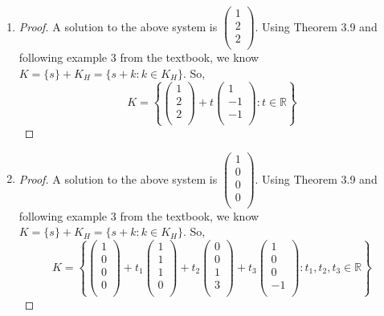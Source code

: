 \documentclass[11pt]{scrartcl}
\begin{document}
\begin{enumerate}[label=\alph*.]
	\item{
		\begin{proof}
			A solution to the above system is  
			$
			\begin{pmatrix}
				1\\
				2\\
				2\\
			\end{pmatrix}
			$.
			Using Theorem 3.9 and following example 3 from the textbook, we know $K = \{s\} + K_H = \{s + k : k \in K_H \}$.
			So, 
			\[
			K=
			\left\{
				\begin{pmatrix}
					1\\
					2\\
					2\\
				\end{pmatrix}
				+ 
				t\begin{pmatrix}
					1\\
					-1\\
					-1\\
				\end{pmatrix}: t \in \mathbb{R}
			\right\}
			\]
		\end{proof}
	}
	\item{
		\begin{proof}
			A solution to the above system is  
			$
			\begin{pmatrix}
				1\\
				0\\
				0\\
				0\\
			\end{pmatrix}
			$.	
			Using Theorem 3.9 and following example 3 from the textbook, we know $K = \{s\} + K_H = \{s + k : k \in K_H \}$.
			So, 
			\[
			K=
			\left\{
				\begin{pmatrix}
					1\\
					0\\
					0\\
					0\\
				\end{pmatrix} +
				t_1\begin{pmatrix}
					1\\
					1\\
					1\\
					0\\
				\end{pmatrix}+
				t_2\begin{pmatrix}
					0\\
					0\\
					1\\
					3\\
				\end{pmatrix}+
				t_3\begin{pmatrix}
					1\\
					0\\
					0\\
					-1\\
				\end{pmatrix}: t_1, t_2, t_3 \in \mathbb{R}
			\right\}
			\]
		\end{proof}
		}


\end{enumerate}
\end{document}
